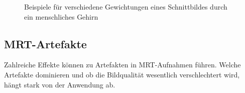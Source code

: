 \begin{figure}[H]
	\centering
	\hfill
	\hfill
	\caption[Beispiele für unterschiedlich gewichtete Spinecho-Aufnahmen]{Beispiele für verschiedene Gewichtungen eines Schnittbildes durch ein menschliches Gehirn \cite[S.~424ff]{Bushberg2011}}
	\label{fig:BildgewichtungenBsp}
\end{figure}





\subsection{MRT-Artefakte}
Zahlreiche Effekte können zu Artefakten in MRT-Aufnahmen führen. Welche Artefakte dominieren und ob die Bildqualität wesentlich verschlechtert wird, hängt stark von der Anwendung ab.

